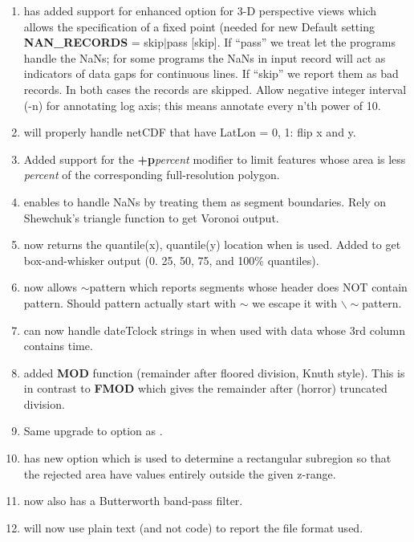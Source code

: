 \begin{enumerate}
	\item {} has added support for enhanced  option for 3-D perspective
		views which allows the specification of a fixed point (needed for
		new Default setting {\bf NAN\_RECORDS} = skip$|$pass [skip].
		If ``pass'' we treat let the programs handle the NaNs; for some
		programs the NaNs in input record will act as indicators of
		data gaps for continuous lines.  If ``skip'' we report them
		as bad records.  In both cases the records are skipped.
		Allow negative integer interval (-n) for annotating log axis; this means annotate every n'th power of 10.
	\item {} will properly handle netCDF that have LatLon = 0, 1: flip x and y.
	\item {} Added support for the {\bf+p}{\it percent} modifier to limit features whose
		area is less {\it percent} of the corresponding full-resolution polygon.
	\item {} enables  to handle NaNs by treating them as segment
		boundaries.  Rely on Shewchuk's triangle function to get Voronoi output.
	\item {} now returns the quantile(x), quantile(y) location when  is used.
		Added  to get box-and-whisker output (0. 25, 50, 75, and 100\% quantiles).
	\item {} now allows $\sim$pattern which reports segments whose header does NOT contain pattern.
		Should pattern actually start with $\sim$ we escape it with $\backslash\sim$pattern.
	\item {} can now handle dateTclock strings in  when used with
		data whose 3rd column contains time.
	\item {} added {\bf MOD} function (remainder after floored division,
		Knuth style). This is in contrast to {\bf FMOD} which gives the remainder after (horror) truncated division.
	\item {} Same upgrade to  option as .
	\item {} has new option  which is used to determine a rectangular subregion
		so that the rejected area have values entirely outside the given z-range.
	\item {} now also has a Butterworth band-pass filter.
	\item {} will now use plain text (and not code) to report the file format used.

\end{enumerate}
